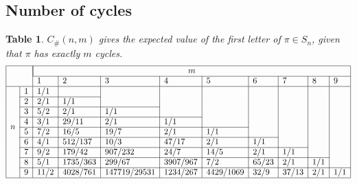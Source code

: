 \documentclass{article}
\newcommand{\n}[1]{\multicolumn{1}{|c|}{#1}}
\newtheorem{datatable}[theo]{Table}
\begin{document}
\subsection{Number of cycles}
\begin{datatable} $C_\#(n, m)$ gives the expected value of the first letter of
  $\pi \in S_n$, given that $\pi$ has exactly $m$ cycles.
\[
  \begin{array}{|ll|l|l|l|l|l|l|l|l|l|}
  \hline
  & & \multicolumn{9}{|c|}{m} \\ \cline{3-11}
  & & 1 & 2 & 3 & 4 & 5 & 6 & 7 & 8 & 9\\ \hline
  \multirow{8}{*}{$n$}
  & \n{1} & 1/1  &          &              &          &           &       &       &     &     \\ \cline{2-4}
  & \n{2} & 2/1  & 1/1      &              &          &           &       &       &     &     \\ \cline{2-5}
  & \n{3} & 5/2  & 2/1      & 1/1          &          &           &       &       &     &     \\ \cline{2-6}
  & \n{4} & 3/1  & 29/11    & 2/1          & 1/1      &           &       &       &     &     \\ \cline{2-7}
  & \n{5} & 7/2  & 16/5     & 19/7         & 2/1      & 1/1       &       &       &     &     \\ \cline{2-8}
  & \n{6} & 4/1  & 512/137  & 10/3         & 47/17    & 2/1       & 1/1   &       &     &     \\ \cline{2-9}
  & \n{7} & 9/2  & 179/42   & 907/232      & 24/7     & 14/5      & 2/1   & 1/1   &     &     \\ \cline{2-10}
  & \n{8} & 5/1  & 1735/363 & 299/67       & 3907/967 & 7/2       & 65/23 & 2/1   & 1/1 &     \\ \cline{2-11}
  & \n{9} & 11/2 & 4028/761 & 147719/29531 & 1234/267 & 4429/1069 & 32/9  & 37/13 & 2/1 & 1/1 \\ \hline
  \end{array}
\]
\end{datatable}
\end{document}
